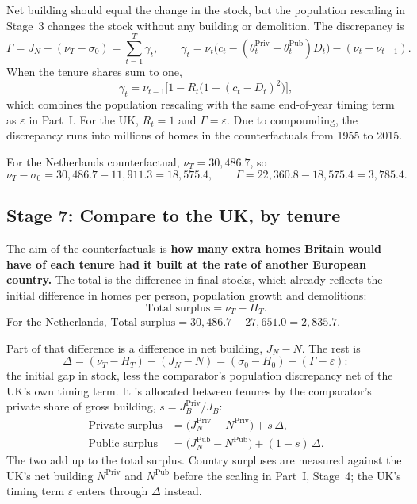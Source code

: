 \documentclass[11pt,a4paper]{article}
\newcommand{\priv}{\mathrm{Priv}}
\newcommand{\pub}{\mathrm{Pub}}
\begin{document}
Net building should equal the change in the stock, but the population rescaling in
Stage~3 changes the stock without any building or demolition. The discrepancy is
\[
  \Gamma = J_N - (\nu_T - \sigma_0) = \sum_{t=1}^{T} \gamma_t,
  \qquad
  \gamma_t = \nu_t\bigl(c_t - (\theta_t^{\priv} + \theta_t^{\pub}) D_t\bigr) - (\nu_t - \nu_{t-1}).
\]
When the tenure shares sum to one,
\[
  \gamma_t = \nu_{t-1}\bigl[1 - R_t\bigl(1 - (c_t - D_t)^2\bigr)\bigr],
\]
which combines the population rescaling with the same end-of-year timing term as
$\varepsilon$ in Part~I. For the UK, $R_t = 1$ and $\Gamma = \varepsilon$. Due to
compounding, the discrepancy runs into millions of homes in the counterfactuals from 1955
to 2015.

For the Netherlands counterfactual, $\nu_T = 30{,}486.7$, so
\[
  \nu_T - \sigma_0 = 30{,}486.7 - 11{,}911.3 = 18{,}575.4,
  \qquad
  \Gamma = 22{,}360.8 - 18{,}575.4 = 3{,}785.4.
\]

\subsection*{Stage 7: Compare to the UK, by tenure}

The aim of the counterfactuals is \textbf{how many extra homes Britain would have of each
tenure had it built at the rate of another European country.} The total is the difference
in final stocks, which already reflects the initial difference in homes per person,
population growth and demolitions:
\[
  \text{Total surplus} = \nu_T - H_T.
\]
For the Netherlands, $\text{Total surplus} = 30{,}486.7 - 27{,}651.0 = 2{,}835.7$.

Part of that difference is a difference in net building, $J_N - N$. The rest is
\[
  \Delta = (\nu_T - H_T) - (J_N - N) = (\sigma_0 - H_0) - (\Gamma - \varepsilon):
\]
the initial gap in stock, less the comparator's population discrepancy net of the UK's own
timing term. It is allocated between tenures by the comparator's private share of gross
building, $s = J_B^{\priv} / J_B$:
\begin{align*}
  \text{Private surplus} &= \bigl(J_N^{\priv} - N^{\priv}\bigr) + s\,\Delta,\\
  \text{Public surplus}  &= \bigl(J_N^{\pub} - N^{\pub}\bigr) + (1 - s)\,\Delta.
\end{align*}
The two add up to the total surplus. Country surpluses are measured against the UK's net
building $N^{\priv}$ and $N^{\pub}$ before the scaling in Part~I, Stage~4; the UK's timing
term $\varepsilon$ enters through $\Delta$ instead.
\end{document}
